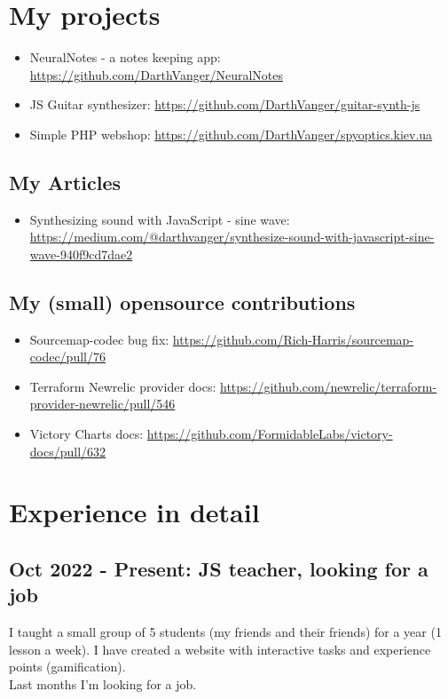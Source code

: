 \documentclass[a4paper, 14pt]{article}
\begin{document}
\section{My projects}
  \begin{itemize}
    \item NeuralNotes - a notes keeping app: \url{https://github.com/DarthVanger/NeuralNotes} \\
    \item JS Guitar synthesizer: \url{https://github.com/DarthVanger/guitar-synth-js} \\
    \item Simple PHP webshop: \url{https://github.com/DarthVanger/spyoptics.kiev.ua}
  \end{itemize}

  \subsection{My Articles}
    \begin{itemize}
      \item Synthesizing sound with JavaScript - sine wave: \url{https://medium.com/@darthvanger/synthesize-sound-with-javascript-sine-wave-940f9cd7dae2}
    \end{itemize}

  \subsection{My (small) opensource contributions}
    \begin{itemize}
      \item Sourcemap-codec bug fix: \url{https://github.com/Rich-Harris/sourcemap-codec/pull/76} \\
      \item Terraform Newrelic provider docs: \url{https://github.com/newrelic/terraform-provider-newrelic/pull/546} \\
      \item Victory Charts docs: \url{https://github.com/FormidableLabs/victory-docs/pull/632}
    \end{itemize}

\section{Experience in detail}

  \subsection{Oct 2022 - Present: JS teacher, looking for a job}
    I taught a small group of 5 students (my friends and their friends) for a year (1 lesson a week). I have created a website with interactive tasks and experience points (gamification). \\
    Last months I'm looking for a job.
\end{document}
